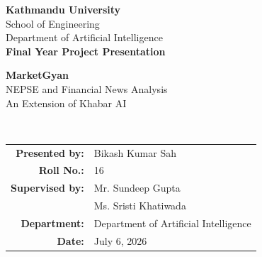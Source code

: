 \documentclass[aspectratio=169,11pt]{beamer}
\title[\projecttitle]{\projecttitle}
\subtitle{An Extension of Khabar AI}
\author{\studentsname \\ Roll No.: \rollnumber}
\institute{\departmentname \\ \universityname}
\date{\submissiondate}
\newcommand{\studentsname}{Bikash Kumar Sah}
\newcommand{\rollnumber}{16}
\newcommand{\supervisorone}{Mr. Sundeep Gupta}
\newcommand{\supervisortwo}{Ms. Sristi Khatiwada}
\newcommand{\departmentname}{Department of Artificial Intelligence}
\newcommand{\universityname}{Kathmandu University}
\newcommand{\submissiondate}{July 6, 2026}
\begin{document}
\begin{frame}[plain]
  \vspace{0.18cm}
  \begin{center}
    {\Large\bfseries \universityname}\\[0.06cm]
    {\normalsize School of Engineering}\\
    {\normalsize \departmentname}\\[0.34cm]
    {\small\bfseries Final Year Project Presentation}\\[0.18cm]
    \colorbox{kublue}{%
      \parbox{0.84\paperwidth}{\centering
        \vspace{0.22cm}
        {\color{white}\Large\bfseries MarketGyan}\\[0.08cm]
        {\color{white}\normalsize NEPSE and Financial News Analysis}\\
        {\color{white}\small An Extension of Khabar AI}
        \vspace{0.22cm}
      }}
    \\[0.45cm]
    \begin{tabular}{@{}rl@{}}
      \textbf{Presented by:} & \studentsname \\
      \textbf{Roll No.:} & \rollnumber \\
      \textbf{Supervised by:} & \supervisorone \\
                              & \supervisortwo \\
      \textbf{Department:} & \departmentname \\
      \textbf{Date:} & \submissiondate \\
    \end{tabular}
  \end{center}
\end{frame}
\end{document}
